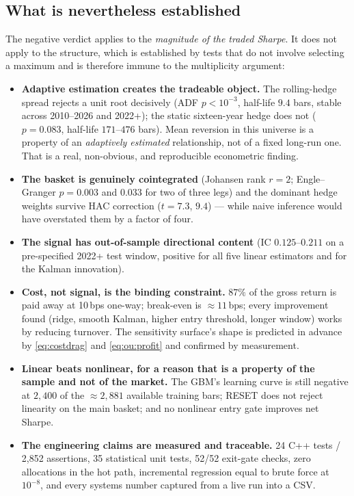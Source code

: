 \subsection{What is nevertheless established}

The negative verdict applies to the \emph{magnitude of the traded Sharpe}. It does not
apply to the structure, which is established by tests that do not involve selecting a
maximum and is therefore immune to the multiplicity argument:

\begin{itemize}
  \item \textbf{Adaptive estimation creates the tradeable object.} The rolling-hedge spread
    rejects a unit root decisively (ADF $p<10^{-3}$, half-life $9.4$ bars, stable across
    2010--2026 and 2022+); the static sixteen-year hedge does not ($p=0.083$, half-life
    $171$--$476$ bars). Mean reversion in this universe is a property of an
    \emph{adaptively estimated} relationship, not of a fixed long-run one. That is a real,
    non-obvious, and reproducible econometric finding.
  \item \textbf{The basket is genuinely cointegrated} (Johansen rank $r=2$; Engle--Granger
    $p=0.003$ and $0.033$ for two of three legs) and the dominant hedge weights survive
    HAC correction ($t=7.3$, $9.4$) --- while naive inference would have overstated them by
    a factor of four.
  \item \textbf{The signal has out-of-sample directional content} (IC $0.125$--$0.211$ on a
    pre-specified 2022+ test window, positive for all five linear estimators and for the
    Kalman innovation).
  \item \textbf{Cost, not signal, is the binding constraint.} $87\%$ of the gross return is
    paid away at 10\,bps one-way; break-even is $\approx11$\,bps; every improvement found
    (ridge, smooth Kalman, higher entry threshold, longer window) works by reducing
    turnover. The sensitivity surface's shape is predicted in advance by
    \eqref{eq:costdrag} and \eqref{eq:ou:profit} and confirmed by measurement.
  \item \textbf{Linear beats nonlinear, for a reason that is a property of the sample and
    not of the market.} The GBM's learning curve is still negative at $2{,}400$ of the
    $\approx2{,}881$ available training bars; RESET does not reject linearity on the main
    basket; and no nonlinear entry gate improves net Sharpe.
  \item \textbf{The engineering claims are measured and traceable.} 24 C++ tests /
    2{,}852 assertions, 35 statistical unit tests, 52/52 exit-gate checks, zero allocations
    in the hot path, incremental regression equal to brute force at $10^{-8}$, and every
    systems number captured from a live run into a CSV.
\end{itemize}

